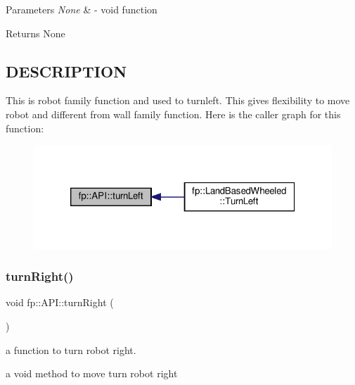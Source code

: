 \begin{DoxyParams}{Parameters}
{\em None} & -\/ void function \\
\hline
\end{DoxyParams}
\begin{DoxyReturn}{Returns}
None 
\end{DoxyReturn}
\hypertarget{_m_a_z_e_8h_DESCRIPTION}{}\subsection{D\+E\+S\+C\+R\+I\+P\+T\+I\+ON}\label{_m_a_z_e_8h_DESCRIPTION}
This is robot family function and used to turnleft. This gives flexibility to move robot and different from wall family function. Here is the caller graph for this function\+:
\nopagebreak
\begin{figure}[H]
\begin{center}
\leavevmode
\includegraphics[width=320pt]{classfp_1_1_a_p_i_aacf09d263f8c47e7f3eae1f348db0b91_icgraph}
\end{center}
\end{figure}
\mbox{\label{classfp_1_1_a_p_i_ac346f1c3ae7a39829c16681be2f25e92}} 
\subsubsection{\texorpdfstring{turn\+Right()}{turnRight()}}
{\footnotesize\ttfamily void fp\+::\+A\+P\+I\+::turn\+Right (\begin{DoxyParamCaption}{ }\end{DoxyParamCaption})\hspace{0.3cm}{\ttfamily [static]}}



a function to turn robot right. 

a void method to move turn robot right


